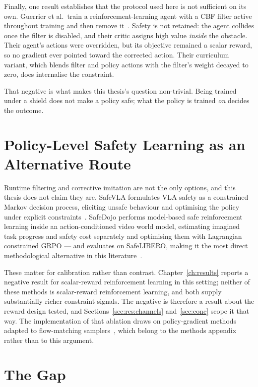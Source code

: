 \documentclass[a4paper,11pt]{report}
\begin{document}
Finally, one result establishes that the protocol used here is not sufficient on its own. Guerrier
et al.\ train a reinforcement-learning agent with a CBF filter active throughout training and then
remove it~\cite{guerrier2025guardrails}. Safety is not retained: the agent collides once the filter
is disabled, and their critic assigns high value \emph{inside} the obstacle. Their agent's actions
were overridden, but its objective remained a scalar reward, so no gradient ever pointed toward the
corrected action. Their curriculum variant, which blends filter and policy actions with the
filter's weight decayed to zero, does internalise the constraint.

That negative is what makes this thesis's question non-trivial. Being trained under a shield does
not make a policy safe; what the policy is trained \emph{on} decides the outcome.

\section{Policy-Level Safety Learning as an Alternative Route}\label{sec:bg:saferl}

Runtime filtering and corrective imitation are not the only options, and this thesis does not claim
they are. SafeVLA formulates VLA safety as a constrained Markov decision process, eliciting unsafe
behaviour and optimising the policy under explicit constraints~\cite{safevla}. SafeDojo performs
model-based safe reinforcement learning inside an action-conditioned video world model, estimating
imagined task progress and safety cost separately and optimising them with Lagrangian constrained
GRPO --- and evaluates on SafeLIBERO, making it the most direct methodological alternative in this
literature~\cite{safedojo}.

These matter for calibration rather than contrast. Chapter~\ref{ch:results} reports a negative
result for scalar-reward reinforcement learning in this setting; neither of these methods is
scalar-reward reinforcement learning, and both supply substantially richer constraint signals. The
negative is therefore a result about the reward design tested, and
Sections~\ref{sec:res:channels} and~\ref{sec:conc} scope it that way. The implementation of that
ablation draws on policy-gradient methods adapted to flow-matching
samplers~\cite{liu2025flowgrpo,shao2024grpo}, which belong to the methods appendix rather than to
this argument.

\section{The Gap}\label{sec:bg:gap}
\end{document}

